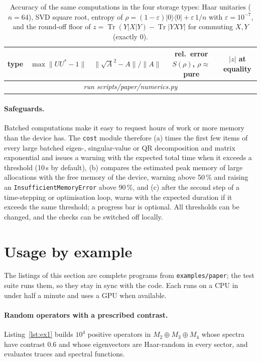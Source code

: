 \documentclass[11pt]{article}
\DeclareMathOperator{\Tr}{Tr}
\providecommand{\NumAccRows}{\multicolumn{5}{c}{\emph{run scripts/paper/numerics.py}}\\}
\begin{document}
\begin{table}[h]
\centering\small
\begin{tabular}{lcccc}
\toprule
type & $\max\|UU^*-1\|$ & $\|\sqrt A^2-A\|/\|A\|$ & rel.\ error $S(\rho)$, $\rho\approx$ pure & $|z|$ at equality\\
\midrule
\NumAccRows
\bottomrule
\end{tabular}
\caption{Accuracy of the same computations in the four storage types: Haar unitaries ($n=64$), SVD square
root, entropy of $\rho=(1-\varepsilon)|0\rangle\langle0|+\varepsilon\,1/n$ with $\varepsilon=10^{-7}$, and the
round-off floor of $z=\Tr(Y|X|Y)-\Tr|YXY|$ for commuting $X,Y$ (exactly $0$).}
\label{tab:numerics-acc}
\end{table}

\paragraph{Safeguards.} Batched computations make it easy to request hours of work or more memory than
the device has. The \texttt{cost} module therefore (a) times the first few items of every large
batched eigen-, singular-value or QR decomposition and matrix exponential and issues a warning with the expected
total time when it exceeds a threshold (10\,s by default), (b) compares the estimated peak memory of
large allocations with the free memory of the device, warning above 50\,\% and raising an
\texttt{InsufficientMemoryError} above 90\,\%, and (c) after the second step of a time-stepping
or optimisation loop, warns with the expected duration if it exceeds the same threshold; a progress bar is optional. All thresholds can
be changed, and the checks can be switched off locally.

\section{Usage by example}\label{sec:usage}

The listings of this section are complete programs from \texttt{examples/paper}; the test suite runs
them, so they stay in sync with the code. Each runs on a CPU in under half a minute and uses a GPU when available.

\paragraph{Random operators with a prescribed contrast.} Listing~\ref{lst:ex1} builds $10^4$ positive
operators in $M_2\oplus M_3\oplus M_4$ whose spectra have contrast $0.6$ and whose eigenvectors are
Haar-random in every sector, and evaluates traces and spectral functions.

\end{document}
